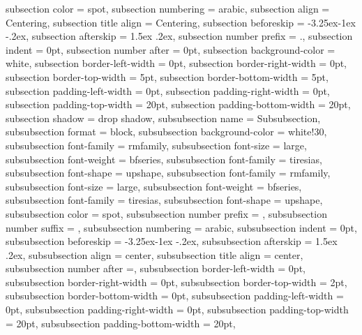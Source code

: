 {{{    subsection color                  = spot,
    subsection numbering              = arabic,
    subsection align                  = Centering, %
    subsection title align            = Centering, %
    subsection beforeskip             = -3.25ex\@plus -1ex \@minus -.2ex,
    subsection afterskip              = 1.5ex \@plus .2ex,
    subsection number prefix          = \thesection.,
    subsection indent                 = 0pt,
    subsection number after           = 0pt,
    subsection background-color       = white,
    subsection border-left-width      = 0pt,
    subsection border-right-width     = 0pt,
    subsection border-top-width       = 5pt,
    subsection border-bottom-width    = 5pt,
    subsection padding-left-width     = 0pt,
    subsection padding-right-width    = 0pt,
    subsection padding-top-width      = 20pt,
    subsection padding-bottom-width   = 20pt,
    subsection shadow                 = drop shadow,
  }
\cxset
  {
    subsubsection name                    = Subsubsection,
    subsubsection format                  = block,
    subsubsection background-color        = white!30, %
    subsubsection font-family             = rmfamily,
    subsubsection font-size               = large,
    subsubsection font-weight             = bfseries,
    subsubsection font-family             = tiresias,
    subsubsection font-shape              = upshape,
    subsubsection font-family             = rmfamily,
    subsubsection font-size               = large,
    subsubsection font-weight             = bfseries,
    subsubsection font-family             = tiresias,
    subsubsection font-shape              = upshape,
    subsubsection color                   = spot,
    subsubsection number prefix           = \thesubsection,
    subsubsection number suffix           = ,
    subsubsection numbering               = arabic,
    subsubsection indent                  = 0pt,
    subsubsection beforeskip              = -3.25ex\@plus -1ex \@minus -.2ex,
    subsubsection afterskip               = 1.5ex \@plus .2ex,
    subsubsection align                   = center,
    subsubsection title align             = center,
    subsubsection number after     =,
    subsubsection border-left-width       = 0pt,
    subsubsection border-right-width      = 0pt,
    subsubsection border-top-width        = 2pt,
    subsubsection border-bottom-width     = 0pt,
    subsubsection padding-left-width      = 0pt,
    subsubsection padding-right-width     = 0pt,
    subsubsection padding-top-width       = 20pt,
    subsubsection padding-bottom-width    = 20pt,
}}}
